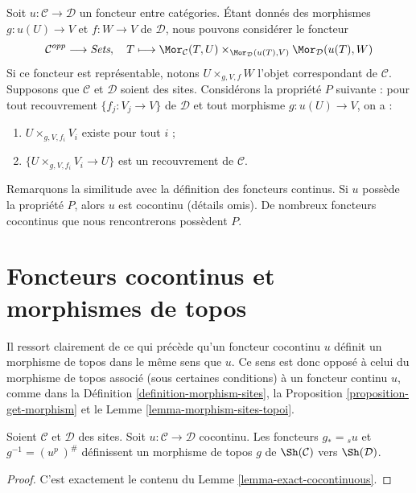 \begin{remark}
\label{remark-cartesian-cocontinuous}
Soit $u : \mathcal{C} \to \mathcal{D}$ un foncteur entre catégories.
Étant donnés des morphismes $g : u(U) \to V$ et $f : W \to V$
de $\mathcal{D}$, nous pouvons considérer le foncteur
$$
\mathcal{C}^{opp} \longrightarrow \textit{Sets},\quad
T \longmapsto
\Mor_\mathcal{C}(T, U)
\times_{\Mor_\mathcal{D}(u(T), V)}
\Mor_\mathcal{D}(u(T), W)
$$
Si ce foncteur est représentable, notons
$U \times_{g, V, f} W$ l’objet correspondant de $\mathcal{C}$.
Supposons que $\mathcal{C}$ et $\mathcal{D}$ soient des sites.
Considérons la propriété $P$ suivante : pour tout recouvrement
$\{f_j : V_j \to V\}$ de $\mathcal{D}$ et tout morphisme
$g : u(U) \to V$, on a :
\begin{enumerate}
\item $U \times_{g, V, f_i} V_i$ existe pour tout $i$ ;
\item $\{U \times_{g, V, f_i} V_i \to U\}$ est un recouvrement de $\mathcal{C}$.
\end{enumerate}
Remarquons la similitude avec la définition des foncteurs continus.
Si $u$ possède la propriété $P$, alors $u$ est cocontinu (détails omis).
De nombreux foncteurs cocontinus que nous rencontrerons possèdent $P$.
\end{remark}

\section{Foncteurs cocontinus et morphismes de topos}
\label{section-cocontinuous-morphism-topoi}

\noindent
Il ressort clairement de ce qui précède qu’un foncteur cocontinu $u$
définit un morphisme de topos dans le même sens que $u$.
Ce sens est donc opposé à celui du morphisme de topos associé
(sous certaines conditions) à un foncteur continu $u$, comme dans la
Définition \ref{definition-morphism-sites}, la
Proposition \ref{proposition-get-morphism} et le
Lemme \ref{lemma-morphism-sites-topoi}.

\begin{lemma}
\label{lemma-cocontinuous-morphism-topoi}
Soient $\mathcal{C}$ et $\mathcal{D}$ des sites.
Soit $u : \mathcal{C} \to \mathcal{D}$ cocontinu.
Les foncteurs $g_* = {}_su$ et $g^{-1} = (u^p\ )^\#$
définissent un morphisme de topos $g$ de $\Sh(\mathcal{C})$ vers
$\Sh(\mathcal{D})$.
\end{lemma}

\begin{proof}
C’est exactement le contenu du Lemme \ref{lemma-exact-cocontinuous}.
\end{proof}

